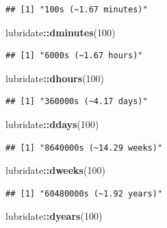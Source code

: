 \documentclass[
]{article}
\newenvironment{Shaded}{\begin{snugshade}}{\end{snugshade}}
\newcommand{\DecValTok}[1]{\textcolor[rgb]{0.00,0.00,0.81}{#1}}
\newcommand{\FunctionTok}[1]{\textcolor[rgb]{0.13,0.29,0.53}{\textbf{#1}}}
\newcommand{\NormalTok}[1]{#1}
\newcommand{\SpecialCharTok}[1]{\textcolor[rgb]{0.81,0.36,0.00}{\textbf{#1}}}
\begin{document}
\begin{verbatim}
## [1] "100s (~1.67 minutes)"
\end{verbatim}

\begin{Shaded}
\begin{Highlighting}[]
\NormalTok{lubridate}\SpecialCharTok{::}\FunctionTok{dminutes}\NormalTok{(}\DecValTok{100}\NormalTok{)}
\end{Highlighting}
\end{Shaded}

\begin{verbatim}
## [1] "6000s (~1.67 hours)"
\end{verbatim}

\begin{Shaded}
\begin{Highlighting}[]
\NormalTok{lubridate}\SpecialCharTok{::}\FunctionTok{dhours}\NormalTok{(}\DecValTok{100}\NormalTok{)}
\end{Highlighting}
\end{Shaded}

\begin{verbatim}
## [1] "360000s (~4.17 days)"
\end{verbatim}

\begin{Shaded}
\begin{Highlighting}[]
\NormalTok{lubridate}\SpecialCharTok{::}\FunctionTok{ddays}\NormalTok{(}\DecValTok{100}\NormalTok{)}
\end{Highlighting}
\end{Shaded}

\begin{verbatim}
## [1] "8640000s (~14.29 weeks)"
\end{verbatim}

\begin{Shaded}
\begin{Highlighting}[]
\NormalTok{lubridate}\SpecialCharTok{::}\FunctionTok{dweeks}\NormalTok{(}\DecValTok{100}\NormalTok{)}
\end{Highlighting}
\end{Shaded}

\begin{verbatim}
## [1] "60480000s (~1.92 years)"
\end{verbatim}

\begin{Shaded}
\begin{Highlighting}[]
\NormalTok{lubridate}\SpecialCharTok{::}\FunctionTok{dyears}\NormalTok{(}\DecValTok{100}\NormalTok{)}
\end{Highlighting}
\end{Shaded}
\end{document}

